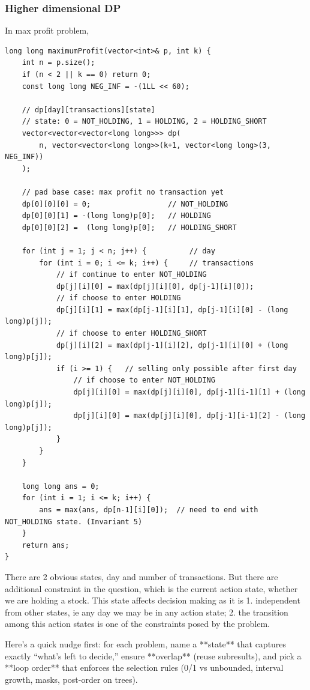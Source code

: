\documentclass[9pt]{extarticle}
\begin{document}
\subsubsection*{Higher dimensional DP}
In max profit problem, 
\begin{lstlisting}
long long maximumProfit(vector<int>& p, int k) {
    int n = p.size();
    if (n < 2 || k == 0) return 0;
    const long long NEG_INF = -(1LL << 60);

    // dp[day][transactions][state]
    // state: 0 = NOT_HOLDING, 1 = HOLDING, 2 = HOLDING_SHORT
    vector<vector<vector<long long>>> dp(
        n, vector<vector<long long>>(k+1, vector<long long>(3, NEG_INF))
    );

    // pad base case: max profit no transaction yet
    dp[0][0][0] = 0;                  // NOT_HOLDING
    dp[0][0][1] = -(long long)p[0];   // HOLDING
    dp[0][0][2] =  (long long)p[0];   // HOLDING_SHORT

    for (int j = 1; j < n; j++) {          // day
        for (int i = 0; i <= k; i++) {     // transactions
            // if continue to enter NOT_HOLDING
            dp[j][i][0] = max(dp[j][i][0], dp[j-1][i][0]);
            // if choose to enter HOLDING
            dp[j][i][1] = max(dp[j-1][i][1], dp[j-1][i][0] - (long long)p[j]);
            // if choose to enter HOLDING_SHORT
            dp[j][i][2] = max(dp[j-1][i][2], dp[j-1][i][0] + (long long)p[j]);
            if (i >= 1) {   // selling only possible after first day
                // if choose to enter NOT_HOLDING
                dp[j][i][0] = max(dp[j][i][0], dp[j-1][i-1][1] + (long long)p[j]);
                dp[j][i][0] = max(dp[j][i][0], dp[j-1][i-1][2] - (long long)p[j]);
            }
        }
    }

    long long ans = 0;
    for (int i = 1; i <= k; i++) {
        ans = max(ans, dp[n-1][i][0]);  // need to end with NOT_HOLDING state. (Invariant 5)
    }
    return ans;
}
\end{lstlisting}
There are 2 obvious states, day and number of transactions. But there are additional constraint in the question, which
is the current action state, whether we are holding a stock. This state affects decision making as it is 1. independent from
other states, ie any day we may be in any action state; 2. the transition among this action states is one of the constraints 
posed by the problem. 

Here’s a quick nudge first: for each problem, name a **state** that captures exactly “what’s left to decide,” ensure **overlap** (reuse subresults), and pick a **loop order** that enforces the selection rules (0/1 vs unbounded, interval growth, masks, post-order on trees).
\end{document}
